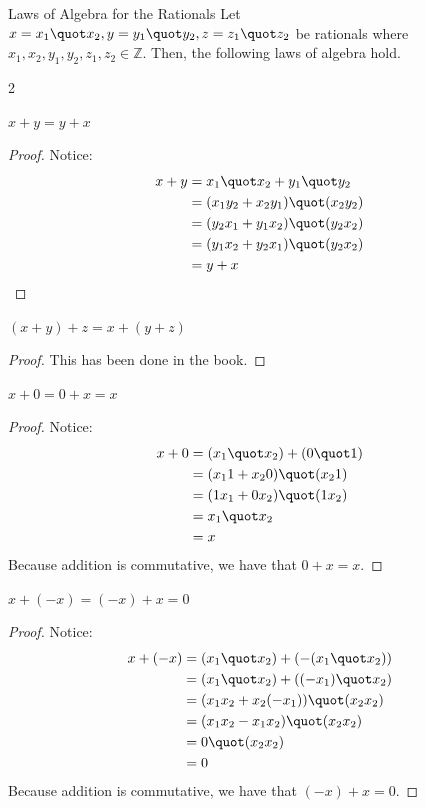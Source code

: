\break
\begin{problem}{Laws of Algebra for the Rationals}
    Let $x = x_1 \quot x_2, y = y_1 \quot y_2, z = z_1 \quot z_2$ be rationals where $x_1, x_2, y_1, y_2, z_1, z_2 \in \mathbb{Z}$. 
    Then, the following laws of algebra hold.
\end{problem}


\begin{multicols}{2}
\begin{proposition}
	$x + y = y + x$
\end{proposition}
\begin{proof}
    Notice:
    \begin{align*}
        x + y &= x_1 \quot x_2 + y_1 \quot y_2 \\
        &= (x_1 y_2 + x_2 y_1) \quot (x_2 y_2) \\
        &= (y_2 x_1 + y_1 x_2) \quot (y_2 x_2) \\
        &= (y_1 x_2 + y_2 x_1) \quot (y_2 x_2) \\
        &= y + x
    \end{align*}
\end{proof}

\begin{proposition}
	$(x+y)+z =x+(y+z)$
\end{proposition}
\begin{proof}
    This has been done in the book.
\end{proof}

\begin{proposition}
	$x+0 = 0+x = x$
\end{proposition}
\begin{proof}
    Notice:
    \begin{align*}
        x + 0 &= (x_1 \quot x_2) + (0 \quot 1) \\
        &= (x_1 1 + x_2 0) \quot (x_2 1) \\
        &= (1 x_1 + 0x_2) \quot (1 x_2) \\
        &= x_1 \quot x_2 \\
        &= x
    \end{align*}
    Because addition is commutative, we have that $0 + x = x.$
\end{proof}

\begin{proposition}
	$x + (-x) = (-x) + x = 0$
\end{proposition}
\begin{proof}
    Notice:
    \begin{align*}
        x + (-x) &= (x_1 \quot x_2) + (-(x_1 \quot x_2)) \\
        &= (x_1 \quot x_2) + ((-x_1) \quot x_2) \\
        &= (x_1 x_2 + x_2 (-x_1)) \quot (x_2 x_2) \\
        &= (x_1 x_2 - x_1 x_2) \quot (x_2 x_2) \\
        &= 0 \quot (x_2 x_2) \\
        &= 0
    \end{align*}
    Because addition is commutative, we have that $(-x) + x = 0.$
\end{proof}


\end{multicols}
